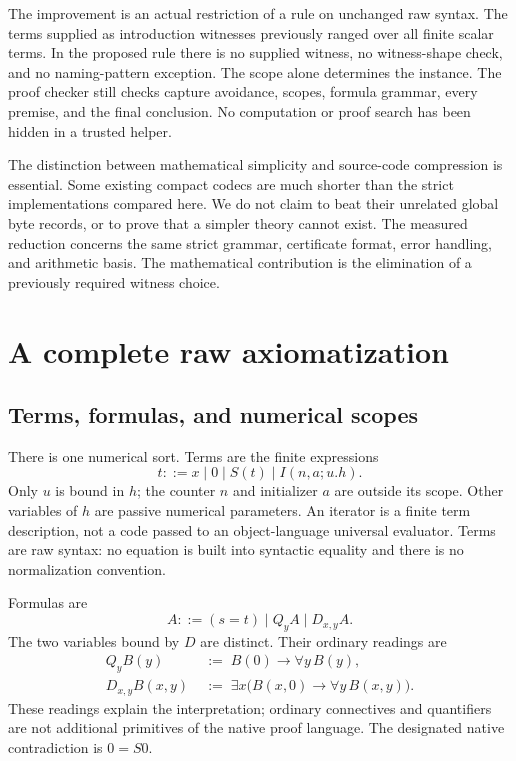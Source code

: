 \documentclass[11pt]{article}
\theoremstyle{definition}
\theoremstyle{remark}
\begin{document}
The improvement is an actual restriction of a rule on unchanged raw
syntax. The terms supplied as introduction witnesses previously ranged
over all finite scalar terms. In the proposed rule there is no supplied
witness, no witness-shape check, and no naming-pattern exception. The
scope alone determines the instance. The proof checker still checks
capture avoidance, scopes, formula grammar, every premise, and the final
conclusion. No computation or proof search has been hidden in a trusted
helper.

The distinction between mathematical simplicity and source-code
compression is essential. Some existing compact codecs are much shorter
than the strict implementations compared here. We do not claim to beat
their unrelated global byte records, or to prove that a simpler theory
cannot exist. The measured reduction concerns the same strict grammar,
certificate format, error handling, and arithmetic basis. The mathematical
contribution is the elimination of a previously required witness choice.

\section{A complete raw axiomatization}
\label{sec:axioms}

\subsection{Terms, formulas, and numerical scopes}

There is one numerical sort. Terms are the finite expressions
\[
 t ::= x\mid 0\mid S(t)\mid I(n,a;u.h).
\]
Only $u$ is bound in $h$; the counter $n$ and initializer $a$ are outside
its scope. Other variables of $h$ are passive numerical parameters. An
iterator is a finite term description, not a code passed to an
object-language universal evaluator. Terms are raw syntax: no equation
is built into syntactic equality and there is no normalization convention.

Formulas are
\[
 A ::= (s=t)\mid Q_yA\mid D_{x,y}A.
\]
The two variables bound by $D$ are distinct. Their ordinary readings are
\begin{align*}
 Q_yB(y)&\;:=\;B(0)\to\forall y\,B(y),\\
 D_{x,y}B(x,y)&\;:=\;\exists x\bigl(B(x,0)\to\forall y\,B(x,y)\bigr).
\end{align*}
These readings explain the interpretation; ordinary connectives and
quantifiers are not additional primitives of the native proof language.
The designated native contradiction is $0=S0$.
\end{document}
